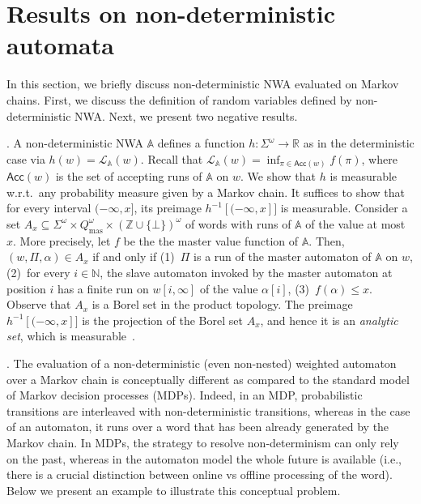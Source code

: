 \documentclass{lmcs}
\newcommand{\nestedA}{\mathbb{A}}
\newcommand{\masterStates}{Q_{\textrm{mas}}}
\newcommand{\masterRun}{\Pi}
\newcommand{\valueL}[1]{\mathcal{L}_{{#1}}}
\newcommand{\N}{\mathbb{N}}
\newcommand{\Z}{\mathbb{Z}}
\newcommand{\R}{\mathbb{R}}
\newcommand{\Acc}{\mathsf{Acc}}
\newcommand{\lopen}[1]{(#1]}
\begin{document}
\section{Results on non-deterministic automata}\label{s:nondeterminism}
In this section, we briefly discuss non-deterministic NWA evaluated on Markov chains.
First, we discuss the definition of random variables defined by non-deterministic NWA\@. Next, we present two negative results.

\smallskip{}.
A non-deterministic NWA $\nestedA$ defines a function $h \colon \Sigma^{\omega} \to \R$ as in the deterministic case via
$h(w) = \valueL{\nestedA}(w)$.
Recall that $\valueL{\nestedA}(w) = \inf_{\pi \in \Acc(w)} f(\pi)$, where $\Acc(w)$ is the set of accepting runs of $\nestedA$ on $w$.
We show that $h$ is measurable w.r.t.\ any probability measure given by a Markov chain.
It suffices to show that for every interval $\lopen{-\infty,x}$, its preimage $h^{-1}[\lopen{-\infty,x}]$ is measurable.
Consider a set $A_x \subseteq \Sigma^{\omega} \times \masterStates^{\omega} \times {(\Z \cup \{\bot\})}^{\omega}$ of words with runs of $\nestedA$ of
the value at most $x$. More precisely, let $f$ be the the master value function of $\nestedA$.
     Then, $(w,\masterRun,\alpha) \in A_x$ if and only if
(1)~$\masterRun$ is a run of the master automaton of $\nestedA$ on $w$,
(2)~for every $i \in \N$, the slave automaton invoked by the master automaton at position $i$ has a finite run on $w[i,\infty]$ of the value
$\alpha[i]$,
(3)~$f(\alpha) \leq x$.
Observe that $A_x$ is a Borel set in the product topology. The preimage $h^{-1}[\lopen{-\infty,x}]$ is
the projection of the Borel set $A_x$, and hence it is an \emph{analytic set}, which is measurable~\cite{kechris}.




\smallskip{}.
The evaluation of a non-deterministic (even non-nested) weighted automaton over a Markov
chain is conceptually different as compared to the standard model of
Markov decision processes (MDPs).
Indeed, in an MDP, probabilistic transitions are interleaved with non-deterministic transitions,
whereas in the case of an automaton, it runs over a word that has been already generated by
the Markov chain.
In MDPs, the strategy to resolve non-determinism can only rely on the past, whereas
in the automaton model the whole future is available (i.e., there is a crucial distinction
between online vs offline processing of the word).
Below we present an example to illustrate
this conceptual problem.
\end{document}
